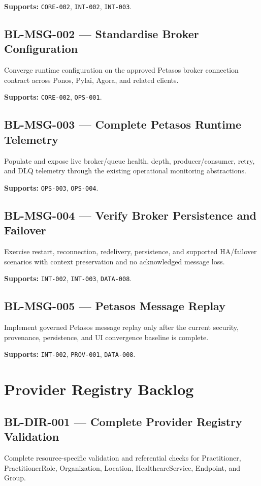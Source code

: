\textbf{Supports:} \texttt{CORE-002}, \texttt{INT-002}, \texttt{INT-003}.

\subsection{BL-MSG-002 --- Standardise Broker Configuration}
Converge runtime configuration on the approved Petasos broker connection contract across Ponos, Pylai, Agora, and related clients.

\textbf{Supports:} \texttt{CORE-002}, \texttt{OPS-001}.

\subsection{BL-MSG-003 --- Complete Petasos Runtime Telemetry}
Populate and expose live broker/queue health, depth, producer/consumer, retry, and DLQ telemetry through the existing operational monitoring abstractions.

\textbf{Supports:} \texttt{OPS-003}, \texttt{OPS-004}.

\subsection{BL-MSG-004 --- Verify Broker Persistence and Failover}
Exercise restart, reconnection, redelivery, persistence, and supported HA/failover scenarios with context preservation and no acknowledged message loss.

\textbf{Supports:} \texttt{INT-002}, \texttt{INT-003}, \texttt{DATA-008}.

\subsection{BL-MSG-005 --- Petasos Message Replay}
Implement governed Petasos message replay only after the current security, provenance, persistence, and UI convergence baseline is complete.

\textbf{Supports:} \texttt{INT-002}, \texttt{PROV-001}, \texttt{DATA-008}.

\section{Provider Registry Backlog}

\subsection{BL-DIR-001 --- Complete Provider Registry Validation}
Complete resource-specific validation and referential checks for Practitioner, PractitionerRole, Organization, Location, HealthcareService, Endpoint, and Group.

